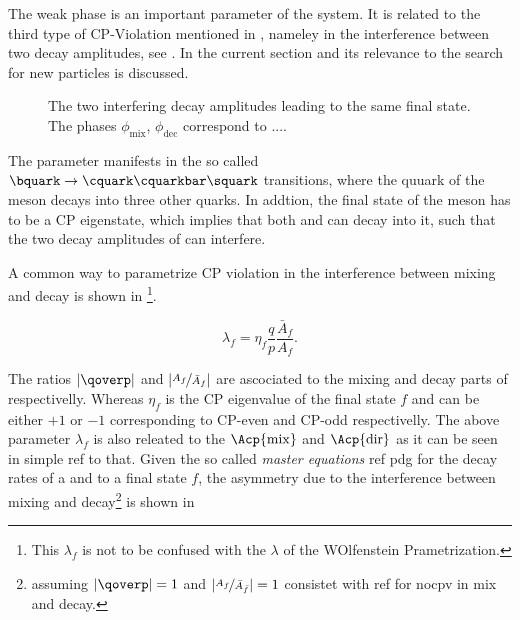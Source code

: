 The weak phase \phis is an important parameter of the \BBbarSyst system. It is related to the third
type of CP-Violation mentioned in , nameley in the interference between
two decay amplitudes, see . In the current section \phis and its relevance to
the search for new particles is discussed.

\newcommand{\ffig}{f}
\newcommand{\phimixfig}{\phi_\text{mix}}
\newcommand{\phifig}{\phi_\text{dec}}
\newcommand{\phibarfig}{\kern 0.15em \overline{\kern -0.15em \phi_\text{dec} \kern -0.60em} \kern 0.60em}
\begin{figure}[h]
  \centering
  \resizebox{0.4\textwidth}{!}{}
  \caption{The two interfering decay amplitudes leading to the same final state.
           The phases $\phimixfig$, $\phifig$ correspond to ....
           }
  \label{interference}
\end{figure}

The parameter \phis manifests in the so called $\bquark \rightarrow \cquark\cquarkbar\squark $ transitions, where the
\bquark quuark of the \Bs meson decays into three other quarks. In addtion, the final state of the \Bs meson has to be
a CP eigenstate, which implies that both \Bs and \Bsb can decay into it, such that the two decay amplitudes of 
can interfere.

A common way to parametrize CP violation in the interference between mixing and decay is shown in 
\footnote{This $\lambda_f$ is not to be confused with the $\lambda$ of the WOlfenstein Prametrization.}.

\begin{equation}
 \lambda_{f} = \eta_f \frac{q}{p} \frac{\bar{A}_f}{A_f}. %
\label{lambda_cpv}
\end{equation}

\noindent The ratios $|\qoverp|$ and $|\nicefrac{A_f}{\bar{A}_{f}}|$ are ascociated to the mixing and decay parts of  respectivelly.
Whereas $\eta_f$ is the CP eigenvalue of the final state $f$ and can be either $+1$ or $-1$ corresponding to CP-even and CP-odd respectivelly.
The above parameter $\lambda_f$ is also releated to the $\Acp{\rm mix}$ and $\Acp{\rm dir}$ as it can be seen in {\color{red}  simple ref to that}.
Given the so called {\it master equations}{\color{red} ref pdg} for the decay rates of a \Bs and \Bsb
to a final state $f$, the \CP asymmetry due to the interference between mixing and decay\footnote{assuming $|\qoverp|=1$ and $|\nicefrac{A_f}{\bar{A}_{\bar{f}}}| = 1$ consistet with {\color{red} ref for nocpv in mix and decay}.}
is shown in 

